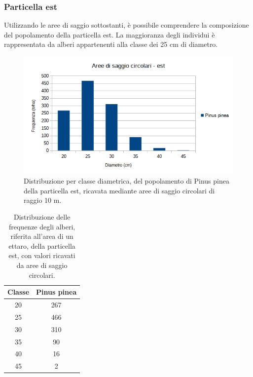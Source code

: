 \subsubsection*{Particella est}
Utilizzando le aree di saggio sottostanti, è possibile comprendere la composizione del popolamento della particella est. La maggioranza degli individui è rappresentata da alberi appartenenti alla classe dei 25 cm di diametro.

\begin{figure}[H]
    \centering
    \includegraphics[width=0.7 \textwidth]{immagini/aree-saggio-est.png}
    \caption{Distribuzione per classe diametrica, del popolamento di Pinus pinea della particella est, ricavata mediante aree di saggio circolari di raggio 10 m. }
    \label{fig:aree_saggio_est}
\end{figure}

\begin{table}[H]
\caption{Distribuzione delle frequenze degli alberi, riferita all'area di un ettaro, della particella est, con valori ricavati da aree di saggio circolari.}
\centering
\begin{tabular}{cc}
\toprule
Classe & Pinus pinea \\
\midrule
20     & 267         \\
25     & 466         \\
30     & 310         \\
35     & 90         \\
40     & 16          \\
45     & 2         \\
\bottomrule
\end{tabular}
\label{tab:tab_area_saggio_est}
\end{table}

